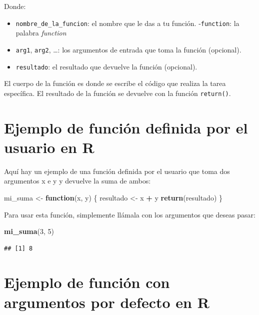 \documentclass[
]{book}
\newenvironment{Shaded}{\begin{snugshade}}{\end{snugshade}}
\newcommand{\ControlFlowTok}[1]{\textcolor[rgb]{0.13,0.29,0.53}{\textbf{#1}}}
\newcommand{\DecValTok}[1]{\textcolor[rgb]{0.00,0.00,0.81}{#1}}
\newcommand{\FunctionTok}[1]{\textcolor[rgb]{0.13,0.29,0.53}{\textbf{#1}}}
\newcommand{\NormalTok}[1]{#1}
\newcommand{\OtherTok}[1]{\textcolor[rgb]{0.56,0.35,0.01}{#1}}
\newcommand{\SpecialCharTok}[1]{\textcolor[rgb]{0.81,0.36,0.00}{\textbf{#1}}}
\providecommand{\tightlist}{%
  \setlength{\itemsep}{0pt}\setlength{\parskip}{0pt}}
\begin{document}
Donde:

\begin{itemize}
\tightlist
\item
  \texttt{nombre\_de\_la\_funcion}: el nombre que le das a tu función. -\texttt{function}: la palabra \emph{function}
\item
  \texttt{arg1}, \texttt{arg2}, \ldots: los argumentos de entrada que toma la función (opcional).
\item
  \texttt{resultado}: el resultado que devuelve la función (opcional).
\end{itemize}

El cuerpo de la función es donde se escribe el código que realiza la tarea específica. El resultado de la función se devuelve con la función \texttt{return()}.

\hypertarget{ejemplo-de-funciuxf3n-definida-por-el-usuario-en-r}{%
\section{Ejemplo de función definida por el usuario en R}\label{ejemplo-de-funciuxf3n-definida-por-el-usuario-en-r}}

Aquí hay un ejemplo de una función definida por el usuario que toma dos argumentos x e y y devuelve la suma de ambos:

\begin{Shaded}
\begin{Highlighting}[]
\NormalTok{mi\_suma }\OtherTok{\textless{}{-}} \ControlFlowTok{function}\NormalTok{(x, y) \{}
\NormalTok{  resultado }\OtherTok{\textless{}{-}}\NormalTok{ x }\SpecialCharTok{+}\NormalTok{ y}
  \FunctionTok{return}\NormalTok{(resultado)}
\NormalTok{\}}
\end{Highlighting}
\end{Shaded}

Para usar esta función, simplemente llámala con los argumentos que deseas pasar:

\begin{Shaded}
\begin{Highlighting}[]
\FunctionTok{mi\_suma}\NormalTok{(}\DecValTok{3}\NormalTok{, }\DecValTok{5}\NormalTok{)}
\end{Highlighting}
\end{Shaded}

\begin{verbatim}
## [1] 8
\end{verbatim}

\hypertarget{ejemplo-de-funciuxf3n-con-argumentos-por-defecto-en-r}{%
\section{Ejemplo de función con argumentos por defecto en R}\label{ejemplo-de-funciuxf3n-con-argumentos-por-defecto-en-r}}
\end{document}
